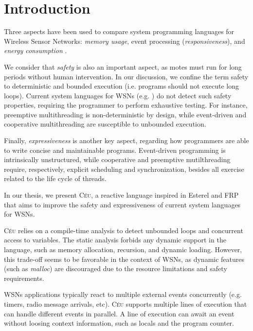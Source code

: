 \documentclass[10pt]{sigplan-proc-varsize-sensys11}
\newcommand{\2}{\;\;}
\newcommand{\5}{\;\;\;\;\;}
\newcommand{\CEU}{\textsc{C\'{e}u}}
\begin{document}
\section{Introduction}
\label{sec.intro}

Three aspects have been used to compare system programming languages for 
Wireless Sensor Networks: \emph{memory usage}, event processing 
(\emph{responsiveness}), and \emph{energy consumption} \cite{wsn.comparison}.

We consider that \emph{safety} is also an important aspect, as motes must run 
for long periods without human intervention.
In our discussion, we confine the term safety to deterministic and bounded 
execution (i.e.  programs should not execute long loops).
Current system languages for WSNs (e.g. \cite{wsn.tos, wsn.protothreads, 
wsn.mantisos}) do not detect such safety properties, requiring the programmer 
to perform exhaustive testing.
For instance, preemptive multithreading is non-deterministic by design, while 
event-driven and cooperative multithreading are susceptible to unbounded 
execution.

Finally, \emph{expressiveness} is another key aspect, regarding how programmers 
are able to write concise and maintainable programs.
Event-driven programming is intrinsically unstructured, while cooperative and 
preemptive mutilthreading require, respectively, explicit scheduling and 
synchronization, besides all exercise related to the life cycle of threads.

In our thesis, we present \CEU, a reactive language inspired in Esterel 
\cite{esterel.design} and FRP \cite{frp.fran} that aims to improve the safety 
and expressiveness of current system languages for WSNs.

\CEU{} relies on a compile-time analysis to detect unbounded loops and 
concurrent access to variables.
The static analysis forbids any dynamic support in the language, such as memory 
allocation, recursion, and dynamic loading.
However, this trade-off seems to be favorable in the context of WSNs, as 
dynamic features (such as \emph{malloc}) are discouraged due to the resource 
limitations and safety requirements.

WSNs applications typically react to multiple external events concurrently 
(e.g. timers, radio message arrivals, etc).
\CEU{} supports multiple lines of execution that can handle different events in 
parallel.
A line of execution can await an event without loosing context information, 
such as locals and the program counter.
\end{document}
